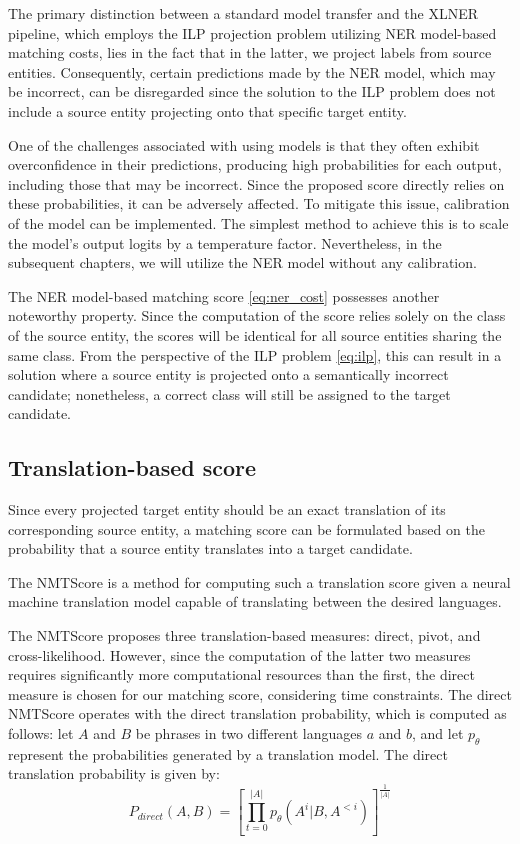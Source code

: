 The primary distinction between a standard model transfer and the XLNER pipeline,
which employs the ILP projection problem utilizing NER model-based matching costs,
lies in the fact that in the latter, we project labels from source entities.
Consequently, certain predictions made by the NER model, which may be incorrect,
can be disregarded since the solution to the ILP problem does not include a
source entity projecting onto that specific target entity.

One of the challenges associated with using models is that they often exhibit
overconfidence in their predictions, producing high probabilities for each output,
including those that may be incorrect. Since the proposed score directly relies on
these probabilities, it can be adversely affected. To mitigate this issue, calibration
of the model can be implemented. The simplest method to achieve this is to scale
the model's output logits by a temperature factor. Nevertheless, in the subsequent chapters,
we will utilize the NER model without any calibration.

The NER model-based matching score \eqref{eq:ner_cost} possesses another noteworthy
property. Since the computation of the score relies solely on the class of the source
entity, the scores will be identical for all source entities sharing the same class.
From the perspective of the ILP problem \eqref{eq:ilp}, this can result in a solution
where a source entity is projected onto a semantically incorrect candidate;
nonetheless, a correct class will still be assigned to the target candidate.

\subsection{Translation-based score}

Since every projected target entity should be an exact translation of its corresponding
source entity, a matching score can be formulated based on the probability that a
source entity translates into a target candidate.

The NMTScore \cite{vamvas_sennrich_2022_nmtscore} is a method for computing such a
translation score given a neural machine translation model capable of translating
between the desired languages.

The NMTScore proposes three translation-based measures: direct, pivot, and cross-likelihood.
However, since the computation of the latter two measures requires significantly more
computational resources than the first, the direct measure is chosen for our matching
score, considering time constraints. The direct NMTScore operates with the direct
translation probability, which is computed as follows: let \( A \) and \( B \) be
phrases in two different languages \( a \) and \( b \), and let \( p_{\theta} \)
represent the probabilities generated by a translation model. The direct translation
probability is given by:
\[
  P_{direct}(A, B) = \left[ \prod\limits_{t=0}^{|A|} p_{\theta}(A^i|B, A^{<i}) \right]^{\frac{1}{|A|}}
\]

